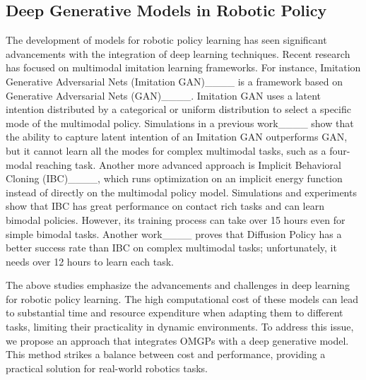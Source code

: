 \subsection{Deep Generative Models in Robotic Policy}
The development of models for robotic policy learning has seen significant advancements with the integration of deep learning techniques. Recent research has focused on multimodal imitation learning frameworks. For instance, Imitation Generative Adversarial Nets (Imitation GAN)____ is a framework based on Generative Adversarial Nets (GAN)____. Imitation GAN uses a latent intention distributed by a categorical or uniform distribution to select a specific mode of the multimodal policy.
Simulations in a previous work____ show that the ability to capture latent intention of an Imitation GAN outperforms GAN, but it cannot learn all the modes for complex multimodal tasks, such as a four-modal reaching task.
Another more advanced approach is Implicit Behavioral Cloning (IBC)____, which runs optimization on an implicit energy function instead of directly on the multimodal policy model. 
Simulations and experiments show that IBC has great performance on contact rich tasks and can learn bimodal policies. 
However, its training process can take over 15 hours even for simple bimodal tasks.
Another work____ proves that Diffusion Policy has a better success rate than IBC on complex multimodal tasks; unfortunately, it needs over 12 hours to learn each task.


The above studies emphasize the advancements and challenges in deep learning for robotic policy learning. The high computational cost of these models can lead to substantial time and resource expenditure when adapting them to different tasks, limiting their practicality in dynamic environments. To address this issue, we propose an approach that integrates OMGPs with a deep generative model. This method strikes a balance between cost and performance, providing a practical solution for real-world robotics tasks.